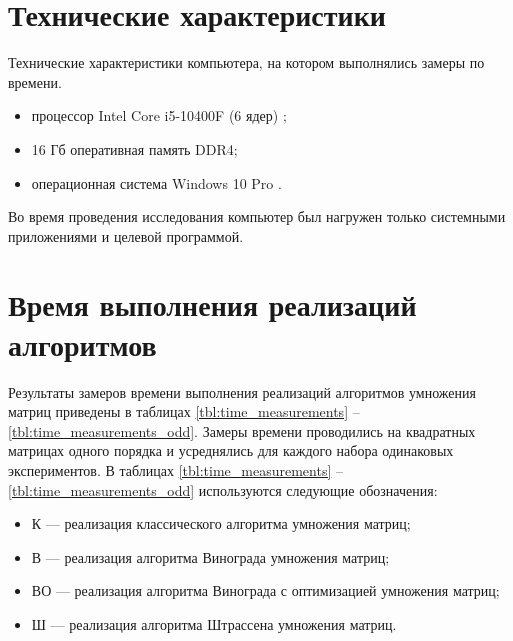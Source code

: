 \clearpage


\section{Технические характеристики}

Технические характеристики компьютера, на котором выполнялись замеры по времени.

\begin{itemize}
	\item процессор Intel Core i5-10400F (6 ядер) \cite{intel};
	\item 16 Гб оперативная память DDR4;
	\item операционная система Windows 10 Pro \cite{windows}.
\end{itemize}

Во время проведения исследования компьютер был нагружен только системными приложениями и целевой программой.

\section{Время выполнения реализаций алгоритмов}

Результаты замеров времени выполнения реализаций алгоритмов умножения матриц приведены в таблицах \ref{tbl:time_measurements} -- \ref{tbl:time_measurements_odd}.
Замеры времени проводились на квадратных матрицах одного порядка и усреднялись для каждого набора одинаковых экспериментов.
В таблицах \ref{tbl:time_measurements} -- \ref{tbl:time_measurements_odd} используются следующие обозначения: 
\begin{itemize}
	\item К --- реализация классического алгоритма умножения матриц;
	\item В --- реализация алгоритма Винограда умножения матриц;
	\item ВО --- реализация алгоритма Винограда с оптимизацией умножения матриц;
	\item Ш --- реализация алгоритма Штрассена умножения матриц.
\end{itemize}

